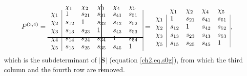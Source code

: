 \begin{equation}
P^{(3,4)}=
\begin{array}{llllll}
 & \hskip 53.0 pt \hbox{\lower 93pt\hbox{\vrule height100pt width 1.0pt}}\hskip-54.0pt \chi_1 & \chi_2 & \chi_3 & \chi_4 & \chi_5 \\
 \noalign{\vskip-91pt}
 \chi_1 & \multicolumn{1}{|l}{ 1 } & s_{21} & s_{31} & s_{41} & \multicolumn{1}{l|}{ s_{51} } \\
 \chi_2 & \multicolumn{1}{|l}{ s_{12} } & 1 & s_{32} & s_{42} & \multicolumn{1}{l|}{ s_{52} } \\
 \chi_3 & \multicolumn{1}{|l}{ s_{13} } & s_{23} & 1 & s_{43} & \multicolumn{1}{l|}{ s_{53} } \\
 \chi_4 & \multicolumn{1}{|l}{ s_{14} } & s_{24} & s_{34} & 1 & \multicolumn{1}{l|}{ s_{54} } \\
 \noalign{\vskip-8pt}
 \multispan6\hbox{\vrule  height 1.0 pt width140pt}\cr
 \noalign{\vskip 7pt}
 \chi_5 & \multicolumn{1}{|l}{ s_{15} } & s_{25} & s_{35} & s_{45} & \multicolumn{1}{l|}{ 1 }
\end{array} =
\begin{array}{lllll}
 &  \chi_1 & \chi_2 & \chi_4 & \chi_5 \\
 \chi_1 & \multicolumn{1}{|l}{ 1 } & s_{21} & s_{41} & \multicolumn{1}{l|}{ s_{51} } \\
 \chi_2 & \multicolumn{1}{|l}{ s_{12} } & 1 & s_{42} & \multicolumn{1}{l|}{ s_{52} } \\
 \chi_3 & \multicolumn{1}{|l}{ s_{13} } & s_{23} & s_{43} & \multicolumn{1}{l|}{s_{53}} \\
 \chi_5 & \multicolumn{1}{|l}{ s_{15} } & s_{25} & s_{45} & \multicolumn{1}{l|}{1}
\end{array},
\label{ch2.eq.p0exampg}
\end{equation}
which is the subdeterminant of $|\mathbf{S}|$ (equation \ref{ch2.eq.s0g}), from which the third column and the fourth row are removed.

